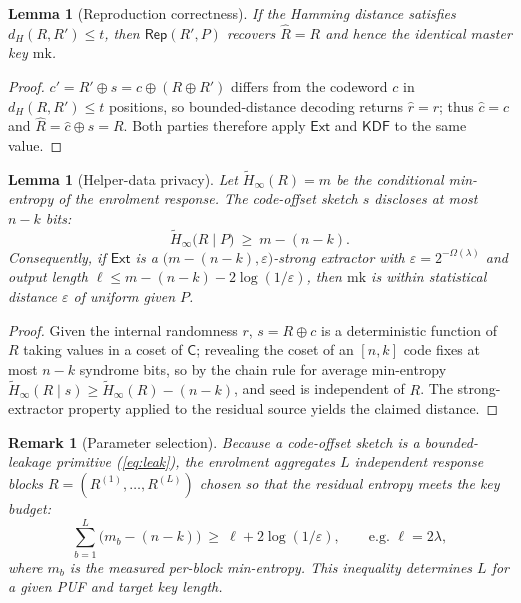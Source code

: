 \documentclass[11pt,a4paper]{article}
\theoremstyle{jrnlplain}
\newtheorem{lemma}[theorem]{Lemma}
\theoremstyle{jrnldef}
\newtheorem{remark}{Remark}
\newcommand{\mk}{\mathrm{mk}}
\newcommand{\KDF}{\mathsf{KDF}}
\newcommand{\Ext}{\mathsf{Ext}}
\newcommand{\Codec}{\mathsf{C}}
\newcommand{\Rep}{\mathsf{Rep}}
\newcommand{\secpar}{\lambda}
\newcommand{\entropy}{\widetilde{H}_\infty}
\newcommand{\xorop}{\oplus}
\begin{document}
\begin{lemma}[Reproduction correctness]\label{lem:fecorrect}
If the Hamming distance satisfies $d_H(R,R')\le t$, then $\Rep(R',P)$ recovers
$\hat R=R$ and hence the identical master key $\mk$.
\end{lemma}
\begin{proof}
$c'=R'\xorop s = c\xorop(R\xorop R')$ differs from the codeword $c$ in
$d_H(R,R')\le t$ positions, so bounded-distance decoding returns $\hat r=r$;
thus $\hat c=c$ and $\hat R=\hat c\xorop s = R$. Both parties therefore apply
$\Ext$ and $\KDF$ to the same value.
\end{proof}

\begin{lemma}[Helper-data privacy]\label{lem:fe}
Let $\entropy(R)=m$ be the conditional min-entropy of the enrolment response.
The code-offset sketch $s$ discloses at most $n-k$ bits:
\begin{equation}
\entropy\!\big(R \mid P\big)\ \ge\ m-(n-k).
\label{eq:leak}
\end{equation}
Consequently, if $\Ext$ is a $\big(m-(n-k),\varepsilon\big)$-strong extractor
with $\varepsilon=2^{-\Omega(\secpar)}$ and output length
$\ell\le m-(n-k)-2\log(1/\varepsilon)$, then $\mk$ is within statistical
distance $\varepsilon$ of uniform given $P$.
\end{lemma}
\begin{proof}
Given the internal randomness $r$, $s=R\xorop c$ is a deterministic function
of $R$ taking values in a coset of $\Codec$; revealing the coset of an
$[n,k]$ code fixes at most $n-k$ syndrome bits, so by the chain rule for
average min-entropy $\entropy(R\mid s)\ge\entropy(R)-(n-k)$, and
$\mathrm{seed}$ is independent of $R$. The strong-extractor property applied to
the residual source yields the claimed distance.
\end{proof}

\begin{remark}[Parameter selection]
Because a code-offset sketch is a bounded-leakage primitive
(\cref{eq:leak}), the enrolment aggregates $L$ independent response blocks
$R=(R^{(1)},\dots,R^{(L)})$ chosen so that the residual entropy meets the key
budget:
\begin{equation}
\sum_{b=1}^{L}\big(m_b-(n-k)\big)\ \ge\ \ell + 2\log(1/\varepsilon),
\qquad\text{e.g. } \ell=2\secpar,
\label{eq:design}
\end{equation}
where $m_b$ is the measured per-block min-entropy. This inequality determines
$L$ for a given PUF and target key length.
\end{remark}
\end{document}
